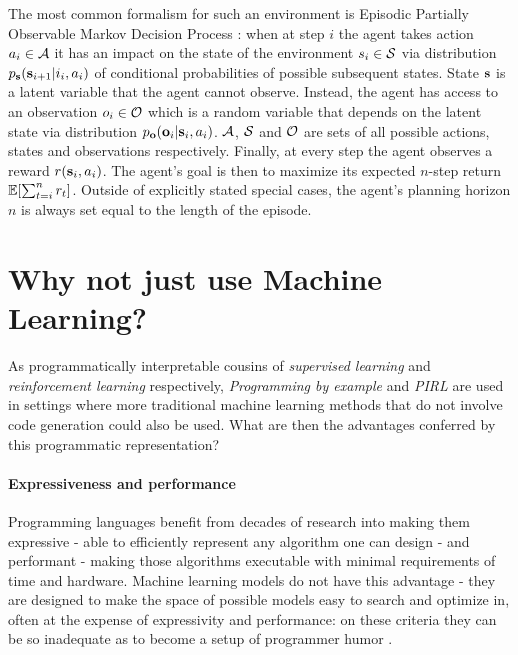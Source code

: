 The most common formalism for such an environment is Episodic Partially Observable Markov Decision Process \cite{kramerjdavidrPartiallyObservableMarkov1964, spaanPartiallyObservableMarkov2012}: when at step $i$ the agent takes action $a_i \in \mathcal{A}$ it has an impact on  the state of the environment $s_i \in \mathcal{S}$ via distribution $p_{\textbf{s}}(\textbf{s}_{i+1} | i_i, a_i)$ of conditional probabilities of possible subsequent states. 
State $\textbf{s}$ is a latent variable that the agent cannot observe.
Instead, the agent has access to an observation $o_i \in \mathcal{O}$ which is a random variable that depends on the latent state via distribution $p_{\mathbf{o}}(\mathbf{o}_i | \textbf{s}_i, a_i)$.
$\mathcal{A}$, $\mathcal{S}$ and $\mathcal{O}$ are sets of all possible actions, states and observations respectively.
Finally, at every step the agent observes a reward $r(\textbf{s}_i,a_i)$.
The agent's goal is then to maximize its expected $n$-step return $\mathbb{E} [ \sum_{t=i}^{n} r_t ]$. Outside of explicitly stated special cases, the agent's planning horizon $n$ is always set equal to the length of the episode.

\newpage
\section{Why not just use Machine Learning?}
\label{sec:whynotml}

As programmatically interpretable cousins of \emph{supervised learning} and \emph{reinforcement learning} respectively, \emph{Programming by example} and \emph{PIRL} are  used in settings where more traditional machine learning methods that do not involve code generation could also be used.
What are then the advantages conferred by this programmatic representation?

\paragraph{Expressiveness and performance}

Programming languages benefit from decades of research into making them \textcolor{accent}{expressive} - able to efficiently represent any algorithm one can design - and \textcolor{accent}{performant} - making those algorithms executable with minimal requirements of time and hardware.
Machine learning models do not have this advantage - they are designed to make the space of possible models easy to search and optimize in, often at the expense of expressivity and performance: on these criteria they can be so inadequate as to become a setup of programmer humor \cite{JoelGrusFizz}.


